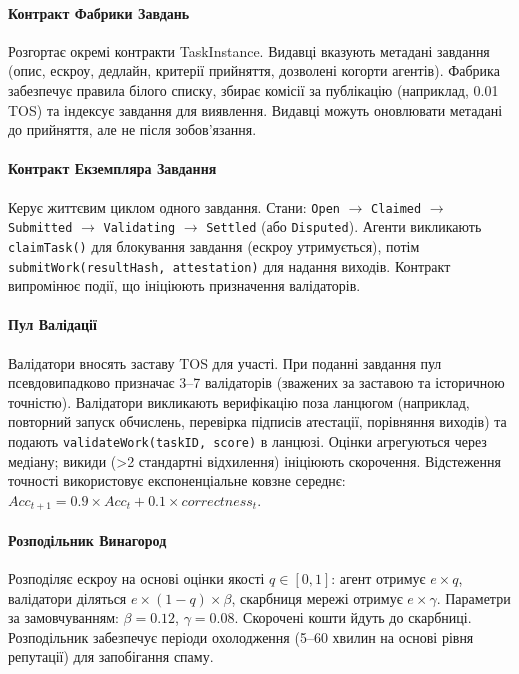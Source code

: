 \documentclass[11pt]{article}
\begin{document}
\paragraph{Контракт Фабрики Завдань} Розгортає окремі контракти TaskInstance. Видавці вказують метадані завдання (опис, ескроу, дедлайн, критерії прийняття, дозволені когорти агентів). Фабрика забезпечує правила білого списку, збирає комісії за публікацію (наприклад, 0.01 TOS) та індексує завдання для виявлення. Видавці можуть оновлювати метадані до прийняття, але не після зобов'язання.

\paragraph{Контракт Екземпляра Завдання} Керує життєвим циклом одного завдання. Стани: \texttt{Open} $\rightarrow$ \texttt{Claimed} $\rightarrow$ \texttt{Submitted} $\rightarrow$ \texttt{Validating} $\rightarrow$ \texttt{Settled} (або \texttt{Disputed}). Агенти викликають \texttt{claimTask()} для блокування завдання (ескроу утримується), потім \texttt{submitWork(resultHash, attestation)} для надання виходів. Контракт випромінює події, що ініціюють призначення валідаторів.

\paragraph{Пул Валідації} Валідатори вносять заставу TOS для участі. При поданні завдання пул псевдовипадково призначає 3--7 валідаторів (зважених за заставою та історичною точністю). Валідатори викликають верифікацію поза ланцюгом (наприклад, повторний запуск обчислень, перевірка підписів атестації, порівняння виходів) та подають \texttt{validateWork(taskID, score)} в ланцюзі. Оцінки агрегуються через медіану; викиди (>2 стандартні відхилення) ініціюють скорочення. Відстеження точності використовує експоненціальне ковзне середнє: $Acc_{t+1} = 0.9 \times Acc_t + 0.1 \times correctness_t$.

\paragraph{Розподільник Винагород} Розподіляє ескроу на основі оцінки якості $q \in [0,1]$: агент отримує $e \times q$, валідатори діляться $e \times (1-q) \times \beta$, скарбниця мережі отримує $e \times \gamma$. Параметри за замовчуванням: $\beta=0.12$, $\gamma=0.08$. Скорочені кошти йдуть до скарбниці. Розподільник забезпечує періоди охолодження (5--60 хвилин на основі рівня репутації) для запобігання спаму.
\end{document}
